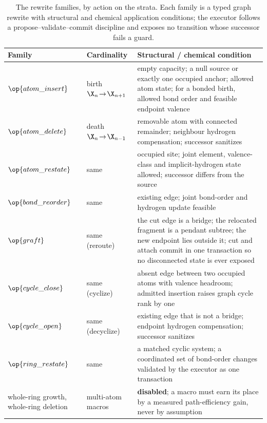 \begin{table}[h]
\centering
\small
\caption{The rewrite families, by action on the strata. Each family is a typed graph rewrite with structural and chemical application conditions; the executor follows a propose--validate--commit discipline and exposes no transition whose successor fails a guard.}
\label{tab:operators}
\begin{tabularx}{\textwidth}{@{}llY@{}}
\toprule
Family & Cardinality & Structural / chemical condition\\
\midrule
$\op{atom\_insert}$ & birth $\X_n\!\to\!\X_{n+1}$ & empty capacity; a null source or exactly one occupied anchor; allowed atom state; for a bonded birth, allowed bond order and feasible endpoint valence\\
$\op{atom\_delete}$ & death $\X_n\!\to\!\X_{n-1}$ & removable atom with connected remainder; neighbour hydrogen compensation; successor sanitizes\\
$\op{atom\_restate}$ & same & occupied site; joint element, valence-class and implicit-hydrogen state allowed; successor differs from the source\\
$\op{bond\_reorder}$ & same & existing edge; joint bond-order and hydrogen update feasible\\
$\op{graft}$ & same (reroute) & the cut edge is a bridge; the relocated fragment is a pendant subtree; the new endpoint lies outside it; cut and attach commit in one transaction so no disconnected state is ever exposed\\
$\op{cycle\_close}$ & same (cyclize) & absent edge between two occupied atoms with valence headroom; admitted insertion raises graph cycle rank by one\\
$\op{cycle\_open}$ & same (decyclize) & existing edge that is not a bridge; endpoint hydrogen compensation; successor sanitizes\\
$\op{ring\_restate}$ & same & a matched cyclic system; a coordinated set of bond-order changes validated by the executor as one transaction\\
\midrule
whole-ring growth, whole-ring deletion & multi-atom macros & \textbf{disabled}; a macro must earn its place by a measured path-efficiency gain, never by assumption\\
\bottomrule
\end{tabularx}
\end{table}

